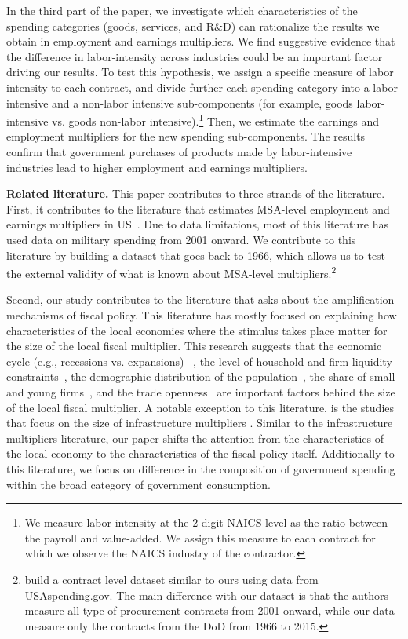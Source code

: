 \documentclass[dv_diss_main.tex]{subfiles}
\begin{document}
In the third part of the paper, we investigate which characteristics of the spending categories (goods, services, and R\&D) can rationalize the results we obtain in employment and earnings multipliers. We find suggestive evidence that the difference in labor-intensity across industries could be an important factor driving our results. To test this hypothesis, we assign a specific measure of labor intensity to each contract, and divide further each spending category into a labor-intensive and a non-labor intensive sub-components (for example, goods labor-intensive vs. goods non-labor intensive).\footnote{ 
We measure labor intensity at the 2-digit NAICS level as the ratio between the payroll and value-added. We assign this measure to each contract for which we observe the NAICS industry of the contractor.} Then, we estimate the earnings and employment multipliers for the new spending sub-components. The results confirm that government purchases of products made by labor-intensive industries lead to higher employment and earnings multipliers.

\textbf{Related literature.} This paper contributes to three strands of the literature. First, it contributes to the literature that estimates MSA-level employment and earnings multipliers in US~\citep{suarez2016estimating, Demyanyk2019, Auerbach2019, Auerbach2020, Juarros2021}. Due to data limitations, most of this literature has used data on military spending from 2001 onward. We contribute to this literature by building a dataset that goes back to 1966, which allows us to test the external validity of what is known about MSA-level multipliers.\footnote{\citep{Cox2021} build a contract level dataset similar to ours using data from USAspending.gov. The main difference with our dataset is that the authors measure all type of procurement contracts from 2001 onward, while our data measure only the contracts from the DoD from 1966 to 2015.}  

Second, our study contributes to the literature that asks about the amplification mechanisms of fiscal policy. This literature has mostly focused on explaining how characteristics of the local economies where the stimulus takes place matter for the size of the local fiscal multiplier. This research suggests that the economic cycle (e.g., recessions vs. expansions) ~\citep{cohen2011powerful, serrato2016estimating,buchheim2020job}, the level of household and firm liquidity constraints~\citep{Hagedorn2019, Auclert2018, Demyanyk2019,auerbach2020effects, bruckner2014local}, the demographic distribution of the population~\citep{basso2021young}, the share of small and young firms~\citep{Juarros2021}, and the trade openness~\citep{corbi2019regional} are important factors behind the size of the local fiscal multiplier. A notable exception to this literature, is the studies that focus on the size of infrastructure multipliers \citep{Boehm2020, buchheim2017employment,garin2019putting,ramey2020macroeconomic}. Similar to the infrastructure multipliers literature, our paper shifts the attention from the characteristics of the local economy to the characteristics of the fiscal policy itself. Additionally to this literature, we focus on difference in the composition of government spending within the broad category of government  consumption. 
\end{document}
